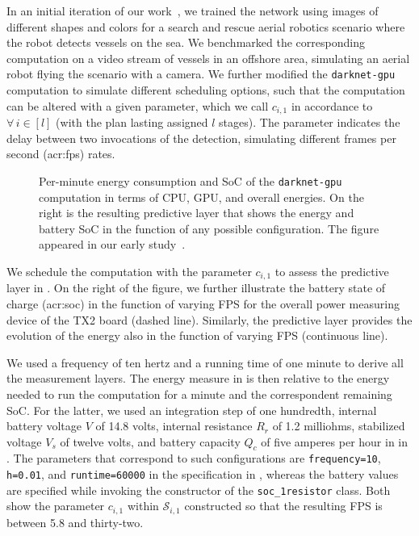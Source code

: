 In an initial iteration of our work~\citep{teamplayd43}, we trained the network using images of different shapes and colors for a search and rescue aerial robotics scenario where the robot detects vessels on the sea. We benchmarked the corresponding computation on a video stream of vessels in an offshore area, simulating an aerial robot flying the scenario with a camera. We further modified the {\small\tt darknet-gpu} computation to simulate different scheduling options, such that the computation can be altered with a given parameter, which we call $c_{i,1}$ in accordance to  $\forall\,i\in[l]$  (with the plan lasting assigned $l$ stages). The parameter indicates the delay between two invocations of the detection, simulating different frames per second (\Gls{acr:fps}) rates. 
\begin{figure}[h!]
  \centering
  \selectfont
  
  \caption[Per-minute energy consumption and SoC of the object detection computation]{Per-minute energy consumption and SoC of the {\tt darknet-gpu} computation in terms of CPU, GPU, and overall energies. On the right is the resulting predictive layer that shows the energy and battery SoC in the function of any possible configuration. The figure appeared in our early study~\citep{seewald2019coarse}.}
  \label{fig:darknet-layer2}
\end{figure}
We schedule the computation with the parameter $c_{i,1}$ to assess the predictive layer in . On the right of the figure, we further illustrate the battery state of charge (\Gls{acr:soc}) in the function of varying FPS for the overall power measuring device of the TX2 board (dashed line). Similarly, the predictive layer provides the evolution of the energy also in the function of varying FPS (continuous line).

We used a frequency of ten hertz and a running time of one minute to derive all the measurement layers. The energy measure in  is then relative to the energy needed to run the computation for a minute and the correspondent remaining SoC. For the latter, we used an integration step of one hundredth, internal battery voltage $V$ of 14.8 volts, internal resistance $R_r$ of 1.2 milliohms, stabilized voltage $V_s$ of twelve volts, and battery capacity $Q_c$ of five amperes per hour in  in . The parameters that correspond to such configurations are {\small\tt frequency=10}, {\small\tt h=0.01}, and {\small\tt runtime=60000} in the specification in , whereas the battery values are specified while invoking the constructor of the {\small\tt soc\_1resistor} class. Both  show the parameter $c_{i,1}$ within $\mathcal{S}_{i,1}$ constructed so that the resulting FPS is between 5.8 and thirty-two.


